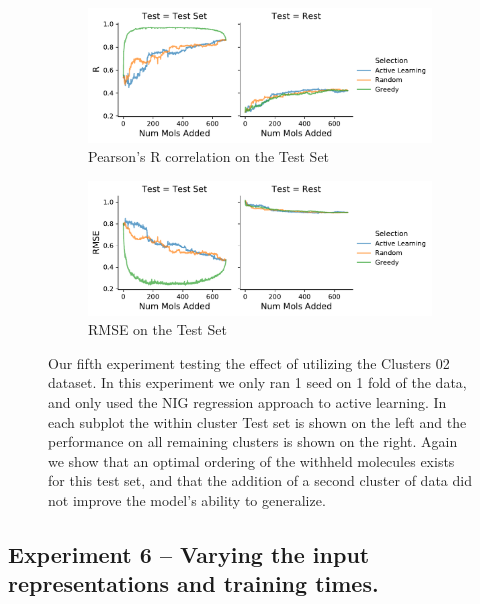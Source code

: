 \documentclass[journal=jmcmar,manuscript=article]{achemso}
\begin{document}
\begin{figure}[tbph]
    \centering
    \begin{subfigure}[b]{0.48\textwidth}
        \includegraphics[width=1\linewidth]{figures/fig5_lc02_R.pdf}
        \caption{Pearson's R correlation on the Test Set}
    \end{subfigure}%
    \hfill
    \begin{subfigure}[b]{0.48\textwidth}
        \includegraphics[width=1\linewidth]{figures/fig5_lc02_RMSE.pdf}
        \caption{RMSE on the Test Set}
    \end{subfigure}
    \caption{Our fifth experiment testing the effect of utilizing the Clusters 02 dataset. In this experiment we only ran 1 seed on 1 fold of the data, and only used the NIG regression approach to active learning. In each subplot the within cluster Test set is shown on the left and the performance on all remaining clusters is shown on the right. Again we show that an optimal ordering of the withheld molecules exists for this test set, and that the addition of a second cluster of data did not improve the model's ability to generalize.}
    \label{fig:lc02greed}
\end{figure}

\subsection{Experiment 6 -- Varying the input representations and training times.}
\end{document}
